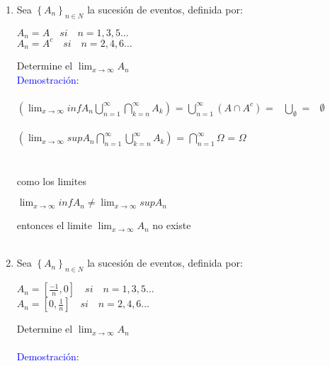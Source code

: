 \documentclass[a4paper, 12pt]{article}
\begin{document}
\begin{enumerate}
\item Sea $\left\lbrace A_n\right\rbrace_{n \in N}$ la sucesi\'on de eventos, definida por:
\begin{center}
$A_n= A  \quad  si \quad  n= 1,3,5 \ldots$\\
$A_n= {A}^c  \quad si \quad  n= 2,4,6 \ldots$\\
\end{center}

Determine el $\displaystyle\lim_{x \rightarrow \infty} A_n $\\

\textcolor{blue}{ Demostraci\'on}:\\\\
$\left(\displaystyle\lim_{x \rightarrow \infty} inf A_n \displaystyle\bigcup_{n=1}^{\infty}\bigcap_{k=n}^{\infty}{A_k}\right) $ = $\displaystyle\bigcup_{n=1}^{\infty}\left(A \cap A^c\right) $ =$\quad\bigcup_{\emptyset} $ =$\quad {\emptyset} $\\\\

$\left(\displaystyle\lim_{x \rightarrow \infty} sup A_n \displaystyle\bigcap_{n=1}^{\infty}\bigcup_{k=n}^{\infty}{A_k}\right) $ = $\displaystyle\bigcap_{n=1}^{\infty}{\Omega} $ = ${\Omega}$\\\\
\\
como los limites\\ 
\begin{center}
$\displaystyle\lim_{x \rightarrow \infty} inf A_n  \neq \displaystyle\lim_{x \rightarrow \infty} sup A_n$
\end{center}
entonces el limite $\displaystyle\lim_{x \rightarrow \infty}A_n$ no existe \\\\
\item Sea $\left\lbrace A_n\right\rbrace_{n \in N}$ la sucesi\'on de eventos, definida por:
 
\begin{center}
$A_n= \left[\frac{-1}{n},0\right] \quad si \quad  n= 1,3,5 \ldots$\\
$A_n= \left[0,\frac{1}{n}\right] \quad si \quad  n= 2,4,6 \ldots$\\
\end{center}
Determine el $\displaystyle\lim_{x \rightarrow \infty} A_n $\\\\
\textcolor{blue}{ Demostraci\'on}:\\


\end{enumerate}
\end{document}
